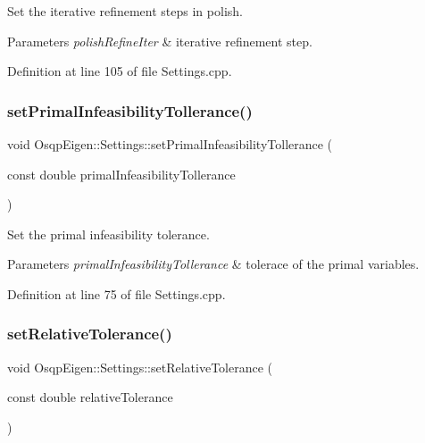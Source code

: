 Set the iterative refinement steps in polish. 


\begin{DoxyParams}{Parameters}
{\em polish\+Refine\+Iter} & iterative refinement step. \\
\hline
\end{DoxyParams}


Definition at line 105 of file Settings.\+cpp.

\mbox{\label{classOsqpEigen_1_1Settings_aa56c63231442a3d6ebc2d78fccec2aab}} 
\subsubsection{\texorpdfstring{set\+Primal\+Infeasibility\+Tollerance()}{setPrimalInfeasibilityTollerance()}}
{\footnotesize\ttfamily void Osqp\+Eigen\+::\+Settings\+::set\+Primal\+Infeasibility\+Tollerance (\begin{DoxyParamCaption}\item[{const double}]{primal\+Infeasibility\+Tollerance }\end{DoxyParamCaption})}



Set the primal infeasibility tolerance. 


\begin{DoxyParams}{Parameters}
{\em primal\+Infeasibility\+Tollerance} & tolerace of the primal variables. \\
\hline
\end{DoxyParams}


Definition at line 75 of file Settings.\+cpp.

\mbox{\label{classOsqpEigen_1_1Settings_aabf457998cd2b4ba6c6e61036a04de1e}} 
\subsubsection{\texorpdfstring{set\+Relative\+Tolerance()}{setRelativeTolerance()}}
{\footnotesize\ttfamily void Osqp\+Eigen\+::\+Settings\+::set\+Relative\+Tolerance (\begin{DoxyParamCaption}\item[{const double}]{relative\+Tolerance }\end{DoxyParamCaption})}



